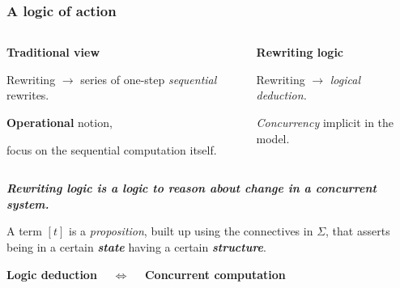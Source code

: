 \documentclass{beamer}
\begin{document}
\begin{frame}
    \frametitle{A logic of action}
    \small
    \begin{columns}[t]
        \begin{column}{.5\textwidth}
            \textbf{Traditional view}

            \bigskip
            Rewriting $\rightarrow$ series of one-step \emph{sequential} rewrites.

            \bigskip
            \textbf{Operational} notion, 
            
            focus on the sequential computation itself.
        \end{column}

        \begin{column}{.5\textwidth}
            \textbf{Rewriting logic}

            \bigskip
            Rewriting $\rightarrow$ \emph{logical deduction.}

            \bigskip
            \emph{Concurrency} implicit in the  model.
        \end{column}
    \end{columns}
    
    \pause
    \bigskip
    \textbf{\emph{Rewriting logic is a logic to reason about change in a concurrent system.}}

    \bigskip

    A term $[t]$ is a \emph{proposition}, built up using the connectives in $\Sigma$, that asserts being in a certain \emph{\textbf{state}} having a certain \emph{\textbf{structure}}.
    \begin{center}
    \textbf{Logic deduction} $\quad \Leftrightarrow \quad$ \textbf{Concurrent computation}
    \end{center}
\end{frame}
\end{document}
